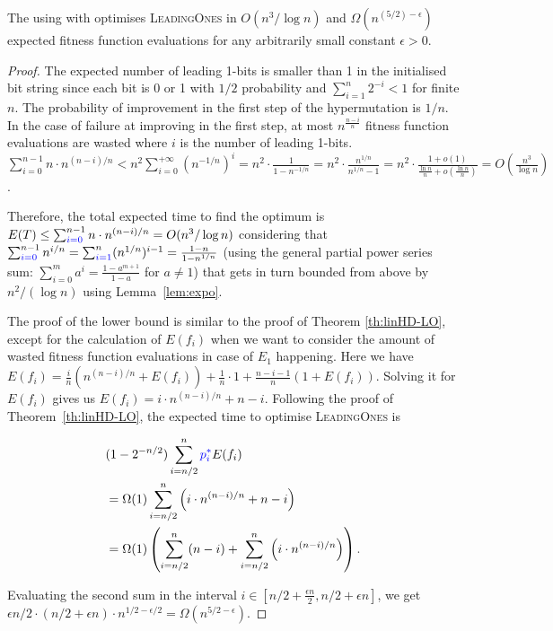 \documentclass[lettersize,journal]{IEEEtran}
\begin{document}
\begin{theorem} \label{expohdOnLO}
The {\oneoneIA } using \IPHfcm{} with {\expoF } optimises \textsc{LeadingOnes} in $O(n^3/\log n)$ and 
$\Omega(n^{(5/2)-\epsilon})$  expected fitness function evaluations for any 
arbitrarily small constant $\epsilon>0$. 
\end{theorem}

\begin{proof}
{\color{blue} The expected number of leading 1-bits is smaller than 1 in the initialised bit 
	string since each bit is 0 or 1 with $1/2$ probability and $\sum^{n}_{i=1}2^{-i}<1$ for finite $n$.} %
The probability of improvement in the first step {\color{blue} of the hypermutation} is $1/n$. In the case of 
failure at improving in the first step, at most $n^{\frac{n-i}{n}}$ fitness 
function evaluations are wasted where $i$ is the number of leading 
1-bits. {\color{blue}$\sum_{i = 0}^{n - 1} n \cdot n^{(n - i) / n} < n^2 \sum_{i = 0}^{+\infty}(n^{-1/n})^i = n^2 \cdot \frac{1}{1 - n^{-1/n}} = n^2 \cdot \frac{n^{1/n}}{n^{1/n} - 1} = n^2 \cdot \frac{1 + o(1)}{\frac{\ln{n}}{n} + o(\frac{\ln{n}}{n})} = O(\frac{n^3}{\log{n}})$. }

Therefore, the total expected time to find the optimum is  $E(T) \leq 
\sum_{{\color{blue}i=0}}^{n-1} n \cdot n^{(n-i)/n}=O( n^3/\log n)$ considering that $ 
\sum_{{\color{blue}i=0}}^{n-1} n^{i/n}= \sum_{{\color{blue}i=1}}^n (n^{1/n})^{i-1}=\frac{1-n}{1-n^{1/n}}$ (using the general partial power series sum: $\sum_{i=0}^{m}a^{i}=\frac{1-a^{m+1}}{1-a}$ for $a\neq 1$)  that gets in turn bounded from above by $n^2/(\log n)$ using Lemma~\ref{lem:expo}.


The proof of the lower bound is similar to the proof of Theorem \ref{th:linHD-LO}, except for the calculation of $E(f_i)$ when we want to consider the amount of wasted fitness function evaluations in case of $E_1$ happening. Here we have $ E(f_i) = \frac{i}{n} \left( n^{(n-i)/n}+ E(f_i)\right) + \frac{1}{n} \cdot 1 +\frac{n-i-1}{n} \left( 1+ E(f_i)\right)$. Solving it for $E(f_i)$ gives us $E(f_i)=i\cdot n^{(n-i)/n}+n-i$. 
{\color{blue}Following the proof of Theorem~\ref{th:linHD-LO}}, the expected time to optimise \textsc{LeadingOnes} is 

\begin{align*}
&(1-2^{-n/2})\sum_{i=n/2}^{n} {\color{blue}p_{i}^{*}} E(f_i)\\
&=\Omega(1) \sum_{i=n/2}^{n} 
\left(i\cdot n^{(n-i)/n}+n-i \right)\\
&=\Omega(1)\left( \sum_{i=n/2}^{n} (n-i)+ 
\sum_{i=n/2}^{n} \left(i\cdot n^{(n-i)/n}\right)\right). 
\end{align*}

Evaluating the second 
sum in the interval $i\in [n/2+\frac{\epsilon n}{2}, n/2+\epsilon n]$, we get $\epsilon 
n/2 \cdot (n/2 + \epsilon n)  \cdot 
n^{1/2-\epsilon/2}=\Omega(n^{5/2-\epsilon})$.
\end{proof}
\end{document}
